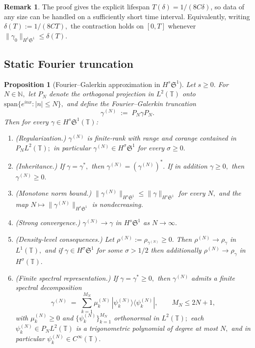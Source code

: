 \documentclass[11pt]{amsart}
\newtheorem{proposition}[theorem]{Proposition}
\theoremstyle{definition}
\newtheorem{remark}[theorem]{Remark}
\newcommand{\T}{\mathbb{T}}
\newcommand{\Sp}{\mathfrak{S}}
\begin{document}
\begin{remark}\label{rem:delta_T}
The proof gives the explicit lifespan $T(\delta)=1/(8C\delta)$, so data of any size can be handled on a sufficiently short time interval. Equivalently, writing $\delta(T):=1/(8CT),$ the contraction holds on $[0,T]$ whenever $\|\gamma_0\|_{H^1\Sp^1}\le\delta(T).$
\end{remark}




\subsection{Static Fourier truncation}
\label{subsec:galerkin_static}

\begin{proposition}[Fourier--Galerkin approximation in $H^s\Sp^1$]
\label{prop:galerkin}
Let $s\ge 0.$ For $N\in\mathbb{N},$ let $P_N$ denote the orthogonal projection in $L^2(\T)$ onto $\mathrm{span}\{e^{inx}:|n|\le N\},$ and define the Fourier--Galerkin truncation
\begin{equation}\label{eq:galerkin_def}
  \gamma^{(N)}\;:=\;P_N\gamma P_N.
\end{equation}
Then for every $\gamma\in H^s\Sp^1(\T)$:
\begin{enumerate}
\item[\textup{(i)}] \emph{(Regularization.)} $\gamma^{(N)}$ is finite-rank with range and corange contained in $P_NL^2(\T);$ in particular $\gamma^{(N)}\in H^\sigma\Sp^1$ for every $\sigma\ge 0.$
\item[\textup{(ii)}] \emph{(Inheritance.)} If $\gamma=\gamma^{*},$ then $\gamma^{(N)}=(\gamma^{(N)})^{*}.$ If in addition $\gamma\ge 0,$ then $\gamma^{(N)}\ge 0.$
\item[\textup{(iii)}] \emph{(Monotone norm bound.)} $\|\gamma^{(N)}\|_{H^s\Sp^1}\le\|\gamma\|_{H^s\Sp^1}$ for every $N,$ and the map $N\mapsto\|\gamma^{(N)}\|_{H^s\Sp^1}$ is nondecreasing.
\item[\textup{(iv)}] \emph{(Strong convergence.)} $\gamma^{(N)}\to\gamma$ in $H^s\Sp^1$ as $N\to\infty.$
\item[\textup{(v)}] \emph{(Density-level consequences.)} Let $\rho^{(N)}:=\rho_{\gamma^{(N)}} \ge 0.$ Then $\rho^{(N)}\to\rho_\gamma$ in $L^1(\T),$ and if $\gamma\in H^\sigma\Sp^1$ for some $\sigma>1/2$ then additionally $\rho^{(N)}\to\rho_\gamma$ in $H^\sigma(\T).$
\item[\textup{(vi)}] \emph{(Finite spectral representation.)} If $\gamma=\gamma^{*}\ge 0,$ then $\gamma^{(N)}$ admits a finite spectral decomposition
\begin{equation}\label{eq:galerkin_spec}
  \gamma^{(N)}
  \;=\; \sum_{k=1}^{M_N}\mu_k^{(N)}\,
  |\psi_k^{(N)}\rangle\langle\psi_k^{(N)}|,
  \qquad M_N\le 2N+1,
\end{equation}
with $\mu_k^{(N)}\ge 0$ and $\{\psi_k^{(N)}\}_{k=1}^{M_N}$ orthonormal in $L^2(\T);$ each $\psi_k^{(N)}\in P_NL^2(\T)$ is a trigonometric polynomial of degree at most $N,$ and in particular $\psi_k^{(N)}\in C^\infty(\T).$
\end{enumerate}
\end{proposition}
\end{document}
